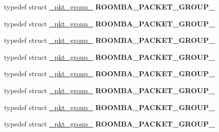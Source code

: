 \begin{DoxyCompactItemize}
\item 
\hypertarget{group__roomba-lib_ga1f00a169fd796ec9eb8ade1aa7dec2df}{}typedef struct \hyperlink{struct__pkt__group__3}{\+\_\+pkt\+\_\+group\+\_} {\bfseries R\+O\+O\+M\+B\+A\+\_\+\+P\+A\+C\+K\+E\+T\+\_\+\+G\+R\+O\+U\+P\+\_}\label{group__roomba-lib_ga1f00a169fd796ec9eb8ade1aa7dec2df}

\item 
\hypertarget{group__roomba-lib_ga59c26ed8020cca7dd87400e66738a010}{}typedef struct \hyperlink{struct__pkt__group__4}{\+\_\+pkt\+\_\+group\+\_} {\bfseries R\+O\+O\+M\+B\+A\+\_\+\+P\+A\+C\+K\+E\+T\+\_\+\+G\+R\+O\+U\+P\+\_}\label{group__roomba-lib_ga59c26ed8020cca7dd87400e66738a010}

\item 
\hypertarget{group__roomba-lib_gab537bc74eca0d7213dcfba2ee37c6b81}{}typedef struct \hyperlink{struct__pkt__group__5}{\+\_\+pkt\+\_\+group\+\_} {\bfseries R\+O\+O\+M\+B\+A\+\_\+\+P\+A\+C\+K\+E\+T\+\_\+\+G\+R\+O\+U\+P\+\_}\label{group__roomba-lib_gab537bc74eca0d7213dcfba2ee37c6b81}

\item 
\hypertarget{group__roomba-lib_ga9eb279c4797806751dfeefcb2968a636}{}typedef struct \hyperlink{struct__pkt__group__6}{\+\_\+pkt\+\_\+group\+\_} {\bfseries R\+O\+O\+M\+B\+A\+\_\+\+P\+A\+C\+K\+E\+T\+\_\+\+G\+R\+O\+U\+P\+\_}\label{group__roomba-lib_ga9eb279c4797806751dfeefcb2968a636}

\item 
\hypertarget{group__roomba-lib_ga7a9adf14c7d16375e9b63842bd444bda}{}typedef struct \hyperlink{struct__pkt__group__100}{\+\_\+pkt\+\_\+group\+\_} {\bfseries R\+O\+O\+M\+B\+A\+\_\+\+P\+A\+C\+K\+E\+T\+\_\+\+G\+R\+O\+U\+P\+\_}\label{group__roomba-lib_ga7a9adf14c7d16375e9b63842bd444bda}

\item 
\hypertarget{group__roomba-lib_ga4524afb00b3767350c67dd348a774a09}{}typedef struct \hyperlink{struct__pkt__group__101}{\+\_\+pkt\+\_\+group\+\_} {\bfseries R\+O\+O\+M\+B\+A\+\_\+\+P\+A\+C\+K\+E\+T\+\_\+\+G\+R\+O\+U\+P\+\_}\label{group__roomba-lib_ga4524afb00b3767350c67dd348a774a09}

\item 
\hypertarget{group__roomba-lib_ga1e149334f68aca1aa488cace5a8b6593}{}typedef struct \hyperlink{struct__pkt__group__106}{\+\_\+pkt\+\_\+group\+\_} {\bfseries R\+O\+O\+M\+B\+A\+\_\+\+P\+A\+C\+K\+E\+T\+\_\+\+G\+R\+O\+U\+P\+\_}\label{group__roomba-lib_ga1e149334f68aca1aa488cace5a8b6593}

\item 
\hypertarget{group__roomba-lib_gab30399751d2795904c23e2a42e2f8a41}{}typedef struct \hyperlink{struct__pkt__group__107}{\+\_\+pkt\+\_\+group\+\_} {\bfseries R\+O\+O\+M\+B\+A\+\_\+\+P\+A\+C\+K\+E\+T\+\_\+\+G\+R\+O\+U\+P\+\_}\label{group__roomba-lib_gab30399751d2795904c23e2a42e2f8a41}

\end{DoxyCompactItemize}
